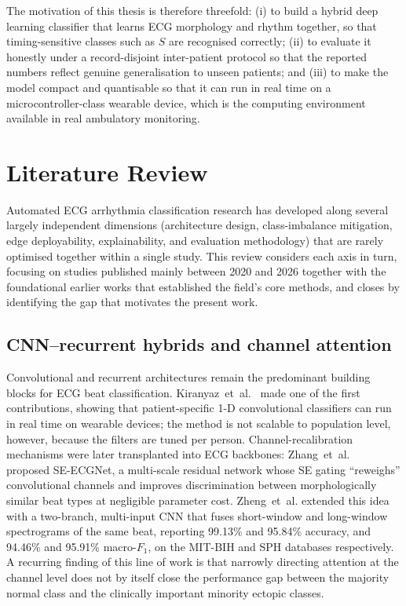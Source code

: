 The motivation of this thesis is therefore threefold: (i) to build a hybrid
deep learning classifier that learns ECG morphology and rhythm together, so
that timing-sensitive classes such as $S$ are recognised correctly;
(ii) to evaluate it honestly under a record-disjoint inter-patient protocol
so that the reported numbers reflect genuine generalisation to unseen
patients; and (iii) to make the model compact and quantisable so that it can
run in real time on a microcontroller-class wearable device, which is the
computing environment available in real ambulatory monitoring.


\section{Literature Review}
\label{sec:literature}

Automated ECG arrhythmia classification research has developed along several
largely independent dimensions (architecture design, class-imbalance
mitigation, edge deployability, explainability, and evaluation
methodology) that are rarely optimised together within a single study. This
review considers each axis in turn, focusing on studies published mainly
between 2020 and 2026 together with the foundational earlier works that
established the field's core methods, and closes by identifying the gap
that motivates the present work.

\subsection{CNN--recurrent hybrids and channel attention}

Convolutional and recurrent architectures remain the predominant building
blocks for ECG beat classification. Kiranyaz~et~al.~\cite{kiranyaz2015}
made one of the first contributions, showing that patient-specific 1-D
convolutional classifiers can run in real time on wearable devices; the
method is not scalable to population level, however, because the filters are
tuned per person. Channel-recalibration mechanisms were later transplanted
into ECG backbones: Zhang~et~al.~\cite{zhang2020seecgnet} proposed
SE-ECGNet, a multi-scale residual network whose SE gating ``reweighs''
convolutional channels and improves discrimination between morphologically
similar beat types at negligible parameter cost. Zheng~et~al.
\cite{zheng2025multiinput} extended this idea with a two-branch, multi-input
CNN that fuses short-window and long-window spectrograms of the same beat,
reporting 99.13\% and 95.84\% accuracy, and 94.46\% and 95.91\% macro-$F_1$,
on the MIT-BIH and SPH databases respectively. A recurring finding of this line of work is
that narrowly directing attention at the channel level does not by itself
close the performance gap between the majority normal class and the
clinically important minority ectopic classes.

